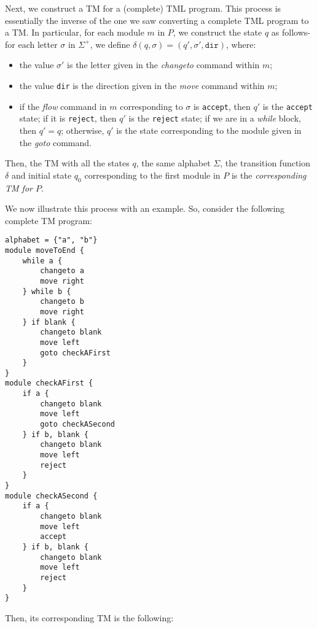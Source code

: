 \begin{appendices}
Next, we construct a TM for a (complete) TML program. This process is essentially the inverse of the one we saw converting a complete TML program to a TM. In particular, for each module $m$ in $P$, we construct the state $q$ as follows- for each letter $\sigma$ in $\Sigma^+$, we define $\delta(q, \sigma) = (q', \sigma', \texttt{dir})$, where:
\begin{itemize}
    \item the value $\sigma'$ is the letter given in the \textit{changeto} command within $m$;
    \item the value \texttt{dir} is the direction given in the \textit{move} command within $m$;
    \item if the \textit{flow} command in $m$ corresponding to $\sigma$ is \texttt{accept}, then $q'$ is the \texttt{accept} state; if it is \texttt{reject}, then $q'$ is the \texttt{reject} state; if we are in a \textit{while} block, then $q' = q$; otherwise, $q'$ is the state corresponding to the module given in the \textit{goto} command.
\end{itemize}
Then, the TM with all the states $q$, the same alphabet $\Sigma$, the transition function $\delta$ and initial state $q_0$ corresponding to the first module in $P$ is the \emph{corresponding TM for $P$}. 

We now illustrate this process with an example. So, consider the following complete TM program:
\begin{lstlisting}[language=TML]
alphabet = {"a", "b"}
module moveToEnd {
    while a {
        changeto a
        move right
    } while b {
        changeto b
        move right
    } if blank {
        changeto blank
        move left
        goto checkAFirst
    }
}
module checkAFirst {
    if a {
        changeto blank
        move left
        goto checkASecond
    } if b, blank {
        changeto blank
        move left
        reject
    }
}
module checkASecond {
    if a {
        changeto blank
        move left
        accept
    } if b, blank {
        changeto blank
        move left
        reject
    }
}
\end{lstlisting}
Then, its corresponding TM is the following:
\begin{figure}[H]
    \centering
\end{figure}
\end{appendices}
